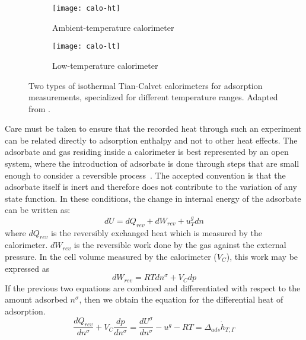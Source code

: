 \begin{figure}[htb]

	\centering
	\begin{subfigure}[b]{.45\textwidth}
		\centering
		\texttt{[image: calo-ht]}
		\caption{Ambient-temperature calorimeter}%
		\label{calo:fig:calo-ht}
	\end{subfigure}
	\begin{subfigure}[b]{.5\textwidth}
		\centering
		\texttt{[image: calo-lt]}
		\caption{Low-temperature calorimeter}%
		\label{calo:fig:calo-lt}
	\end{subfigure}%
	\caption{Two types of isothermal Tian-Calvet calorimeters
		for adsorption measurements, specialized for
		different temperature ranges.
		Adapted from \citeauthor{llewellynGasAdsorptionMicrocalorimetry2005}%
		\cite{llewellynGasAdsorptionMicrocalorimetry2005}.
	}%
	\label{calo:fig:calo-types}

\end{figure}

Care must be taken to ensure that
the recorded heat through such an experiment can be related directly
to adsorption enthalpy and not to other heat effects.
The adsorbate and gas residing inside a calorimeter is best
represented by an open system, where the introduction of adsorbate
is done through steps that are small enough to consider a reversible
process~\cite{rouquerolGasSolidInteractions1980}.
The accepted convention is that the adsorbate itself is inert and
therefore does not contribute to the variation of any state function.
In these conditions,
the change in internal energy of the adsorbate can be written as:
%
\begin{equation}
	dU = dQ_{rev} + dW_{rev} + u_T^g dn
\end{equation}
%
where \(dQ_{rev}\) is the reversibly exchanged heat which is
measured by the calorimeter. \(dW_{rev}\) is the reversible work
done by the gas against the external pressure. In the cell volume measured
by the calorimeter (\(V_C\)), this work may be expressed as
%
\begin{equation}
	dW_{rev} = RT dn^{\sigma} + V_C dp
\end{equation}
%
If the previous two equations are combined and differentiated with
respect to the amount adsorbed \(n^{\sigma}\), then we obtain
the equation for the differential heat of adsorption.
%
\begin{equation}
	\frac{dQ_{rev}}{dn^{\sigma}} + V_C \frac{dp}{dn^{\sigma}} = %
	\frac{dU^{\sigma}}{dn^{\sigma}} - u^g - RT = \Delta_{ads}\dot{h}_{T, \Gamma}
\end{equation}

